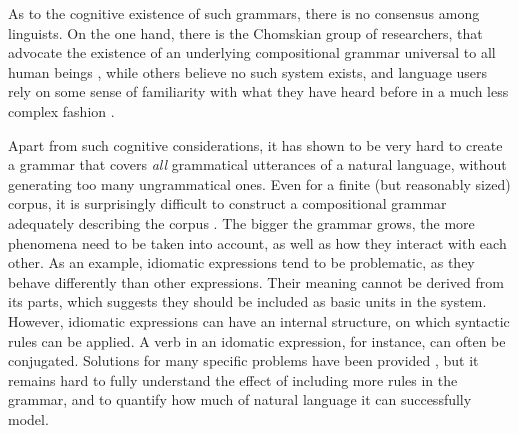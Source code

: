 \documentclass{report}
\begin{document}
As to the cognitive existence of such grammars, there is no consensus among linguists. On the one hand, there is the Chomskian group of researchers, that advocate the existence of an underlying compositional grammar universal to all human beings \citep[as first claimed in][]{chomsky1956three}, while others believe no such system exists, and language users rely on some sense of familiarity with what they have heard before in a much less complex fashion \citep[quite recently, e.g.,][]{frank2012hierarchical}.

Apart from such cognitive considerations, it has shown to be very hard to create a grammar that covers \textit{all} grammatical utterances of a natural language, without generating too many ungrammatical ones.  Even for a finite (but reasonably sized) corpus, it is surprisingly difficult to construct a compositional grammar adequately describing the corpus \citep{scha1990taaltheorie}. The bigger the grammar grows, the more phenomena need to be taken into account, as well as how they interact with each other. As an example, idiomatic expressions tend to be problematic, as they behave differently than other expressions. Their meaning cannot be derived from its parts, which suggests they should be included as basic units in the system. However, idiomatic expressions can have an internal structure, on which syntactic rules can be applied. A verb in an idomatic expression, for instance, can often be conjugated. Solutions for many specific problems have been provided \citep[In e.g.,][]{janssen1996compositionality}, but it remains hard to fully understand the effect of including more rules in the grammar, and to quantify how much of natural language it can successfully model.
\end{document}
